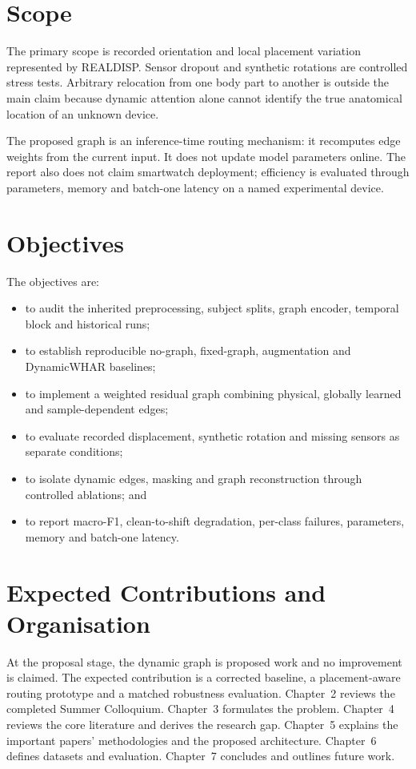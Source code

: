 \documentclass[12pt,a4paper,twoside,openright]{report}
\begin{document}
\section{Scope}
The primary scope is recorded orientation and local placement variation represented by REALDISP. Sensor dropout and synthetic rotations are controlled stress tests. Arbitrary relocation from one body part to another is outside the main claim because dynamic attention alone cannot identify the true anatomical location of an unknown device.

The proposed graph is an inference-time routing mechanism: it recomputes edge weights from the current input. It does not update model parameters online. The report also does not claim smartwatch deployment; efficiency is evaluated through parameters, memory and batch-one latency on a named experimental device.

\section{Objectives}
The objectives are:
\begin{itemize}
\item to audit the inherited preprocessing, subject splits, graph encoder, temporal block and historical runs;
\item to establish reproducible no-graph, fixed-graph, augmentation and DynamicWHAR baselines;
\item to implement a weighted residual graph combining physical, globally learned and sample-dependent edges;
\item to evaluate recorded displacement, synthetic rotation and missing sensors as separate conditions;
\item to isolate dynamic edges, masking and graph reconstruction through controlled ablations; and
\item to report macro-F1, clean-to-shift degradation, per-class failures, parameters, memory and batch-one latency.
\end{itemize}

\section{Expected Contributions and Organisation}
At the proposal stage, the dynamic graph is proposed work and no improvement is claimed. The expected contribution is a corrected baseline, a placement-aware routing prototype and a matched robustness evaluation. Chapter~2 reviews the completed Summer Colloquium. Chapter~3 formulates the problem. Chapter~4 reviews the core literature and derives the research gap. Chapter~5 explains the important papers' methodologies and the proposed architecture. Chapter~6 defines datasets and evaluation. Chapter~7 concludes and outlines future work.
\end{document}
